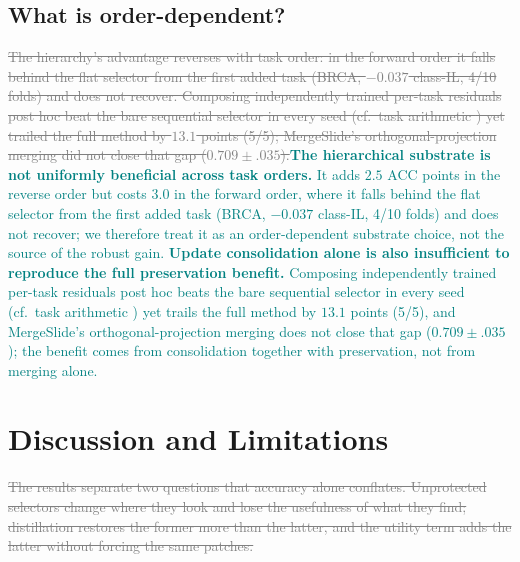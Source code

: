 \documentclass{article}
\newif\ifmarkup \markuptrue
\newcommand{\repc}[3]{\ifmarkup\textcolor{gray}{\sout{#2}}\textcolor{#1}{#3}\else#3\fi}
\newcommand{\repG}[2]{\repc{teal}{#1}{#2}}    %
\begin{document}
\subsection{What is order-dependent?}
\label{ssec:order}

\repG{The hierarchy's advantage reverses with task order: in the forward order it falls behind the flat selector from the first added task (BRCA, $-0.037$ class-IL, 4/10 folds) and does not recover. Composing independently trained per-task residuals post hoc beat the bare sequential selector in every seed (cf.\ task arithmetic \cite{ilharco2023task}) yet trailed the full method by $13.1$ points (5/5); MergeSlide's orthogonal-projection merging \cite{bui2026mergeslide} did not close that gap ($0.709{\pm}.035$).}{\textbf{The hierarchical substrate is not uniformly beneficial across task orders.} It adds $2.5$ ACC points in the reverse order but costs $3.0$ in the forward order, where it falls behind the flat selector from the first added task (BRCA, $-0.037$ class-IL, 4/10 folds) and does not recover; we therefore treat it as an order-dependent substrate choice, not the source of the robust gain. \textbf{Update consolidation alone is also insufficient to reproduce the full preservation benefit.} Composing independently trained per-task residuals post hoc beats the bare sequential selector in every seed (cf.\ task arithmetic \cite{ilharco2023task}) yet trails the full method by $13.1$ points (5/5), and MergeSlide's orthogonal-projection merging \cite{bui2026mergeslide} does not close that gap ($0.709{\pm}.035$); the benefit comes from consolidation together with preservation, not from merging alone.}

\FloatBarrier
\section{Discussion and Limitations}
\label{sec:discussion}

\repG{The results separate two questions that accuracy alone conflates. Unprotected selectors change where they look and lose the usefulness of what they find; distillation restores the former more than the latter, and the utility term adds the latter without forcing the same patches.}{}
\end{document}
